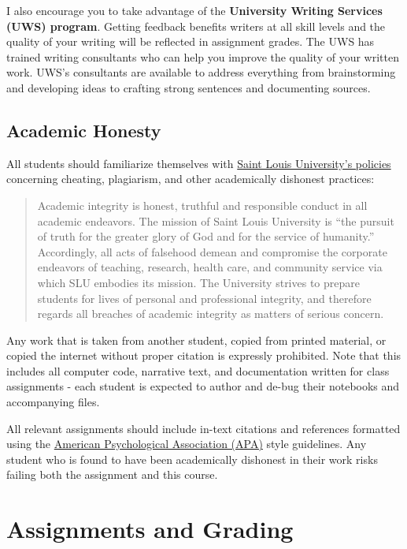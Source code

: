 \documentclass[]{book}
\theoremstyle{definition}
\theoremstyle{definition}
\theoremstyle{definition}
\theoremstyle{remark}
\begin{document}
I also encourage you to take advantage of the \textbf{University Writing
Services (UWS) program}. Getting feedback benefits writers at all skill
levels and the quality of your writing will be reflected in assignment
grades. The UWS has trained writing consultants who can help you improve
the quality of your written work. UWS's consultants are available to
address everything from brainstorming and developing ideas to crafting
strong sentences and documenting sources.

\section{Academic Honesty}\label{academic-honesty}

All students should familiarize themselves with
\href{http://www.slu.edu/Documents/provost/academic_affairs/Academic\%20Integrity\%20Policy\%20FINAL\%20\%206-26-15.pd}{Saint
Louis University's policies} concerning cheating, plagiarism, and other
academically dishonest practices:

\begin{quote}
Academic integrity is honest, truthful and responsible conduct in all
academic endeavors. The mission of Saint Louis University is ``the
pursuit of truth for the greater glory of God and for the service of
humanity.'' Accordingly, all acts of falsehood demean and compromise the
corporate endeavors of teaching, research, health care, and community
service via which SLU embodies its mission. The University strives to
prepare students for lives of personal and professional integrity, and
therefore regards all breaches of academic integrity as matters of
serious concern.
\end{quote}

Any work that is taken from another student, copied from printed
material, or copied the internet without proper citation is expressly
prohibited. Note that this includes all computer code, narrative text,
and documentation written for class assignments - each student is
expected to author and de-bug their notebooks and accompanying files.

All relevant assignments should include in-text citations and references
formatted using the
\href{https://owl.english.purdue.edu/owl/resource/560/01/}{American
Psychological Association (APA)} style guidelines. Any student who is
found to have been academically dishonest in their work risks failing
both the assignment and this course.

\chapter{Assignments and Grading}\label{assignments-and-grading}
\end{document}
